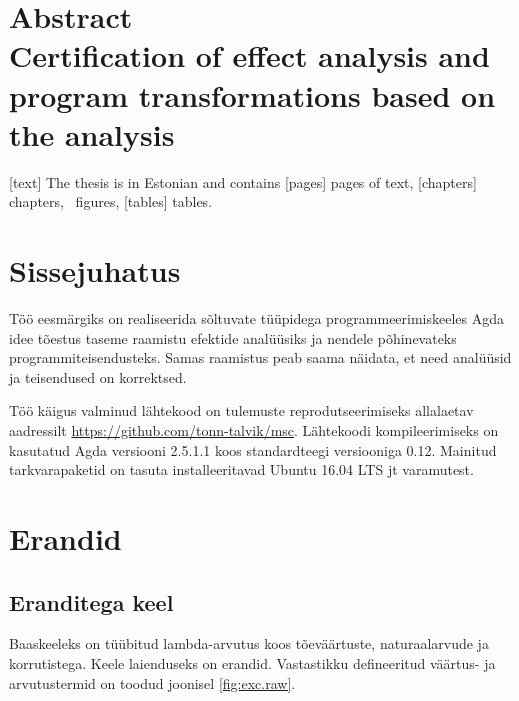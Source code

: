 \documentclass[a4paper,12pt]{article}
\begin{document}
\section*{\vskip 60pt\centering Abstract\\
Certification of effect analysis and program transformations based on the analysis}
[text]
The thesis is in Estonian and contains [pages] pages of text, [chapters] chapters, \totalfigures\ figures, [tables] tables.
\clearpage

\tableofcontents
\clearpage

\listoffigures
\clearpage







\section{Sissejuhatus}

Töö eesmärgiks on realiseerida sõltuvate tüüpidega programmeerimiskeeles Agda idee tõestus taseme
raamistu efektide analüüsiks ja nendele põhinevateks programmiteisendusteks.
Samas raamistus peab saama näidata, et need analüüsid ja teisendused on korrektsed.



Töö käigus valminud lähtekood on tulemuste reprodutseerimiseks allalaetav aadressilt \url{https://github.com/tonn-talvik/msc}.
Lähtekoodi kompileerimiseks on kasutatud Agda versiooni 2.5.1.1 koos standardteegi versiooniga 0.12.
Mainitud tarkvarapaketid on tasuta installeeritavad Ubuntu 16.04 LTS jt varamutest.


\clearpage

\section{Erandid}

\subsection{Eranditega keel}
Baaskeeleks on tüübitud lambda-arvutus koos tõeväärtuste, naturaalarvude ja korrutistega.
Keele laienduseks on erandid.
Vastastikku defineeritud väärtus- ja arvutustermid on toodud joonisel \ref{fig:exc.raw}.
\end{document}
